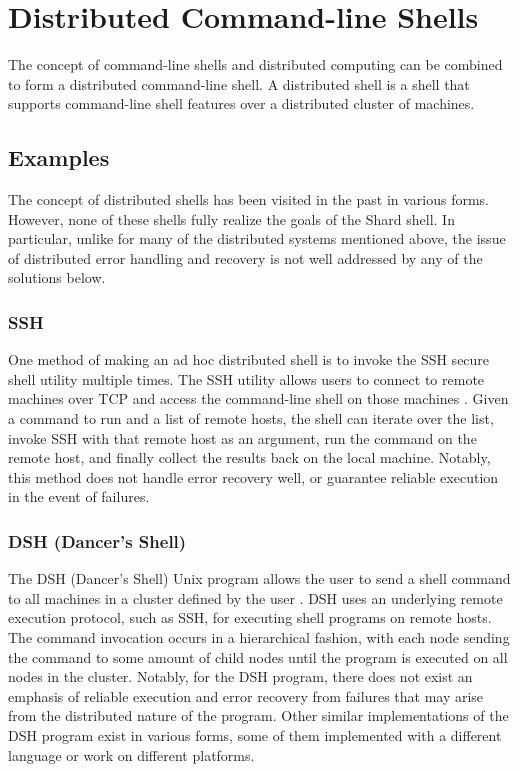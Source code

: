 \documentclass[oneside]{report}
\begin{document}
\section{Distributed Command-line Shells}
The concept of command-line shells and distributed computing can be combined to form a distributed command-line shell.
A distributed shell is a shell that supports command-line shell features over a distributed cluster of machines.

\subsection{Examples}
The concept of distributed shells has been visited in the past in various forms.
However, none of these shells fully realize the goals of the Shard shell.
In particular, unlike for many of the distributed systems mentioned above, the issue of distributed error handling and recovery is not well addressed by any of the solutions below.

\subsubsection{SSH}
One method of making an ad hoc distributed shell is to invoke the SSH secure shell utility multiple times.
The SSH utility allows users to connect to remote machines over TCP and access the command-line shell on those machines \cite{rfc4251}.
Given a command to run and a list of remote hosts, the shell can iterate over the list, invoke SSH with that remote host as an argument, run the command on the remote host, and finally collect the results back on the local machine.
Notably, this method does not handle error recovery well, or guarantee reliable execution in the event of failures.

\subsubsection{DSH (Dancer's Shell)}
The DSH (Dancer's Shell) Unix program allows the user to send a shell command to all machines in a cluster defined by the user \cite{dshdancer}.
DSH uses an underlying remote execution protocol, such as SSH, for executing shell programs on remote hosts.
The command invocation occurs in a hierarchical fashion, with each node sending the command to some amount of child nodes until the program is executed on all nodes in the cluster.
Notably, for the DSH program, there does not exist an emphasis of reliable execution and error recovery from failures that may arise from the distributed nature of the program.
Other similar implementations of the DSH program exist in various forms, some of them implemented with a different language or work on different platforms.
\end{document}
